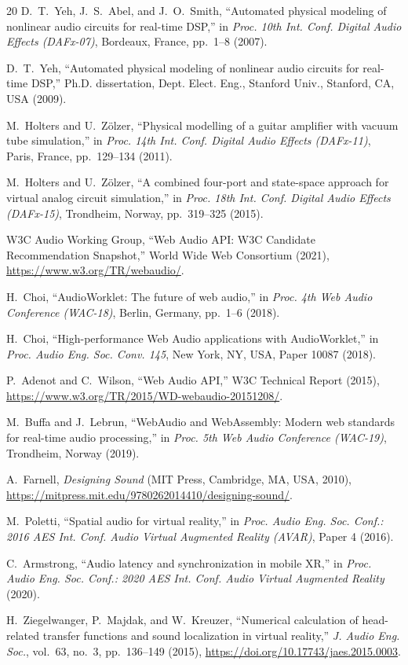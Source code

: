 \documentclass[fleqn,final]{jaes}
\begin{document}
\begin{thebibliography}{20}
D.~T.~Yeh, J.~S.~Abel, and J.~O.~Smith,
``Automated physical modeling of nonlinear audio circuits for real-time DSP,''
in \textit{Proc. 10th Int. Conf. Digital Audio Effects (DAFx-07)}, Bordeaux, France, pp.~1--8 (2007).

D.~T.~Yeh,
``Automated physical modeling of nonlinear audio circuits for real-time DSP,''
Ph.D. dissertation, Dept. Elect. Eng., Stanford Univ., Stanford, CA, USA (2009).

M.~Holters and U.~Z{\"o}lzer,
``Physical modelling of a guitar amplifier with vacuum tube simulation,''
in \textit{Proc. 14th Int. Conf. Digital Audio Effects (DAFx-11)}, Paris, France, pp.~129--134 (2011).

M.~Holters and U.~Z{\"o}lzer,
``A combined four-port and state-space approach for virtual analog circuit simulation,''
in \textit{Proc. 18th Int. Conf. Digital Audio Effects (DAFx-15)}, Trondheim, Norway, pp.~319--325 (2015).

W3C Audio Working Group,
``Web Audio API: W3C Candidate Recommendation Snapshot,''
World Wide Web Consortium (2021),
\url{https://www.w3.org/TR/webaudio/}.

H.~Choi,
``AudioWorklet: The future of web audio,''
in \textit{Proc. 4th Web Audio Conference (WAC-18)}, Berlin, Germany, pp.~1--6 (2018).

H.~Choi,
``High-performance Web Audio applications with AudioWorklet,''
in \textit{Proc. Audio Eng. Soc. Conv. 145}, New York, NY, USA, Paper 10087 (2018).

P.~Adenot and C.~Wilson,
``Web Audio API,''
W3C Technical Report (2015),
\url{https://www.w3.org/TR/2015/WD-webaudio-20151208/}.

M.~Buffa and J.~Lebrun,
``WebAudio and WebAssembly: Modern web standards for real-time audio processing,''
in \textit{Proc. 5th Web Audio Conference (WAC-19)}, Trondheim, Norway (2019).

A.~Farnell,
\textit{Designing Sound}
(MIT Press, Cambridge, MA, USA, 2010),
\url{https://mitpress.mit.edu/9780262014410/designing-sound/}.

M.~Poletti,
``Spatial audio for virtual reality,''
in \textit{Proc. Audio Eng. Soc. Conf.: 2016 AES Int. Conf. Audio Virtual Augmented Reality (AVAR)}, Paper 4 (2016).

C.~Armstrong,
``Audio latency and synchronization in mobile XR,''
in \textit{Proc. Audio Eng. Soc. Conf.: 2020 AES Int. Conf. Audio Virtual Augmented Reality} (2020).

H.~Ziegelwanger, P.~Majdak, and W.~Kreuzer,
``Numerical calculation of head-related transfer functions and sound localization in virtual reality,''
\textit{J. Audio Eng. Soc.}, vol.~63, no.~3, pp.~136--149 (2015),
\url{https://doi.org/10.17743/jaes.2015.0003}.

\end{thebibliography}
\end{document}

